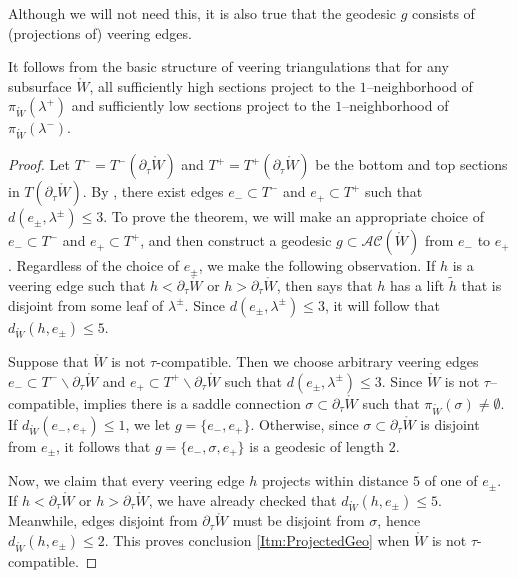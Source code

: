 \documentclass[11pt,letterpaper]{amsart}
\newcommand{\mr}{\mathring}
\newcommand{\bdy}{\partial} %
\newcommand{\psub}{\mr W}
\numberwithin{equation}{section}
\theoremstyle{definition}
\renewcommand{\setminus}{\smallsetminus}
\newcommand{\AC}{\mathcal{AC}}
\newcommand{\dave}[1]{{\color{darkgreen}{#1}}}
\begin{document}
Although we will not need this, it is also true  that the geodesic $g$ consists of (projections of) veering edges.

It follows from the basic structure of veering triangulations that for any subsurface $\psub$, all sufficiently high sections project to the $1$--neighborhood of $\pi_{\psub}(\lambda^+)$ and sufficiently low sections project to the $1$--neighborhood of $\pi_{\psub}(\lambda^-)$. 

\begin{proof}  
Let $T^- = T^-(\bdy_\tau \psub)$ and $T^+ = T^+(\bdy_\tau \psub)$ be the bottom and top sections in $T(\bdy_\tau \psub)$.
By , there exist edges $e_- \subset T^-$ and $e_+ \subset T^+$ such that $d(e_\pm, \lambda^\pm) \leq 3$.
To prove the theorem, we will make an appropriate choice of $e_- \subset T^-$ and $e_+ \subset T^+$, and then construct a geodesic $g \subset \AC(\psub)$ from $e_-$ to $e_+$. Regardless of the choice of $e_\pm$, we make the following observation. If $h$ is a veering edge such that $h < \bdy_\tau \psub$ or $h > \bdy_\tau \psub$, then  says that $h$ has a lift $\widetilde h$  that is disjoint from some leaf of $\lambda^\pm$. Since $d(e_\pm, \lambda^\pm) \leq 3$, it will follow that $d_{\psub}(h, e_\pm) \leq 5$.

\smallskip

Suppose that $\psub$ is not $\tau$-compatible. Then we choose arbitrary veering edges $e_- \subset T^- \setminus \bdy_\tau \psub$ and $e_+ \subset T^+ \setminus \bdy_\tau \psub$ such that $d(e_\pm, \lambda^\pm) \leq 3$. Since $\psub$ is not $\tau$--compatible,
  implies there is a saddle connection $\sigma \subset \bdy_\tau \psub$ such that $\pi_{\psub}(\sigma) \neq \emptyset$.
 If $d_{\psub}(e_-, e_+) \leq 1$, we let $g = \{e_-, e_+\}$. Otherwise, since  $\sigma \subset \bdy_\tau \psub$ is disjoint from $e_\pm$, it follows that $g = \{e_-, \sigma, e_+\}$ is a geodesic of length $2$.
 
 Now, we claim that every veering edge $h$ projects within distance $5$ of one of $e_\pm$. If $h < \bdy_\tau \psub$ or $h > \bdy_\tau \psub$, we have already checked that $d_{\psub}(h, e_\pm) \leq 5$. Meanwhile, edges disjoint from $\bdy_\tau \psub$ must be disjoint from $\sigma$, hence 
$d_{\psub}(h, e_\pm) \leq 2$.
 This proves conclusion \eqref{Itm:ProjectedGeo} when $\psub$ is not $\tau$-compatible.
 

\end{proof}
\end{document}
